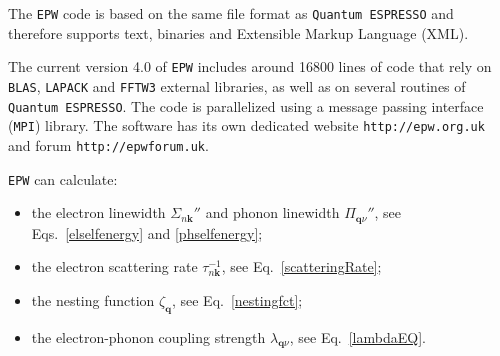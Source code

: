 \documentclass[final,3p,times,twocolumn]{elsarticle}
\begin{document}
The \texttt{EPW} code is based on the same file format as \texttt{Quantum ESPRESSO} and therefore supports text, binaries and Extensible Markup Language (XML).

The current version 4.0 of \texttt{EPW} includes around 16800 lines of code that rely on \texttt{BLAS}, \texttt{LAPACK} and \texttt{FFTW3} external libraries, as well as on several routines of \texttt{Quantum ESPRESSO}. The code is parallelized using a message passing interface (\texttt{MPI}) library.
The software has its own dedicated website \texttt{http://epw.org.uk} and forum \texttt{http://epwforum.uk}. 

\texttt{EPW} can calculate:
\begin{itemize}
	\item the electron linewidth $\Sigma_{n\mathbf{k}}''$ and phonon linewidth $\Pi_{\mathbf{q}\nu}''$, see Eqs.~\eqref{elselfenergy} and \eqref{phselfenergy};	
	\item the electron scattering rate $\tau_{n\mathbf{k}}^{-1}$, see Eq.~\eqref{scatteringRate};
    \item the nesting function $\zeta_{\mathbf{q}}$, see Eq.~\eqref{nestingfct};
	\item the electron-phonon coupling strength $\lambda_{\mathbf{q}\nu}$, see Eq.~\eqref{lambdaEQ}.
\end{itemize}
\end{document}

